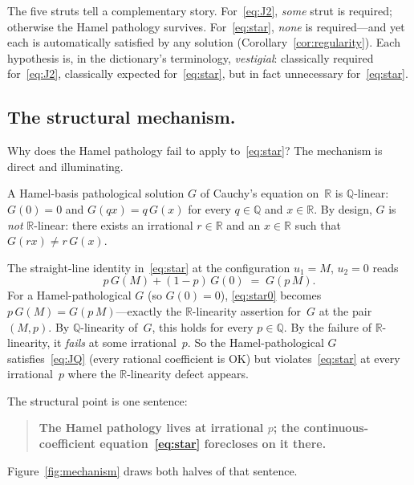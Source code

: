 \documentclass{article}
\theoremstyle{plain}
\theoremstyle{definition}
\newcommand{\R}{\mathbb{R}}
\newcommand{\Q}{\mathbb{Q}}
\begin{document}
The five struts tell a complementary story. For~\eqref{eq:J2},
\emph{some} strut is required; otherwise the Hamel pathology
survives. For~\eqref{eq:star}, \emph{none} is required---and yet each
is automatically satisfied by any solution
(Corollary~\ref{cor:regularity}). Each hypothesis is, in the
dictionary's terminology, \emph{vestigial}: classically required
for~\eqref{eq:J2}, classically expected for~\eqref{eq:star}, but in
fact unnecessary for~\eqref{eq:star}.

\subsection{The structural mechanism.}
\label{ssec:mechanism}

Why does the Hamel pathology fail to apply to~\eqref{eq:star}? The
mechanism is direct and illuminating.

A Hamel-basis pathological solution $G$ of Cauchy's equation on~$\R$ is
$\Q$-linear: $G(0)=0$ and $G(qx)=q\,G(x)$ for every $q\in\Q$ and
$x\in\R$. By design, $G$ is \emph{not} $\R$-linear: there exists an
irrational $r\in\R$ and an $x\in\R$ such that $G(rx)\ne r\,G(x)$.

The straight-line identity in~\eqref{eq:star} at the configuration $u_1=M$,
$u_2=0$ reads
\begin{equation}
p\,G(M)+(1-p)\,G(0) \;=\; G(p\,M).
\tag{$\star_0$}\label{eq:star0}
\end{equation}
For a Hamel-pathological $G$ (so $G(0)=0$), \eqref{eq:star0} becomes
$p\,G(M)=G(p\,M)$---exactly the $\R$-linearity assertion for~$G$ at the
pair $(M,p)$. By $\Q$-linearity of~$G$, this holds for every $p\in\Q$.
By the failure of $\R$-linearity, it \emph{fails} at some irrational~$p$.
So the Hamel-pathological $G$ satisfies~\eqref{eq:JQ} (every rational
coefficient is OK) but violates~\eqref{eq:star} at every irrational~$p$
where the $\R$-linearity defect appears.

The structural point is one sentence:

\begin{quote}
\textbf{The Hamel pathology lives at irrational $p$; the
continuous-coefficient equation~\eqref{eq:star} forecloses on it there.}
\end{quote}

Figure~\ref{fig:mechanism} draws both halves of that sentence.
\end{document}
